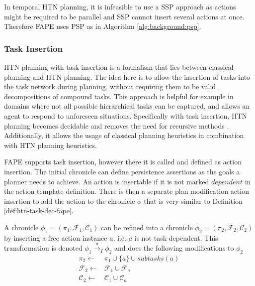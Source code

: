 In temporal \ac{HTN} planning, it is infeasible to use a \ac{SSP} approach as actions might be required to be parallel and \ac{SSP} cannot insert several actions at once.
Therefore \ac{FAPE} uses \ac{PSP} as in Algorithm \ref{alg:background:psp}.

\subsubsection{Task Insertion}

\ac{HTN} planning with task insertion \citep{geierDecidabilityHTNPlanning2011} is a formalism that lies between classical planning and \ac{HTN} planning.
The idea here is to allow the insertion of tasks into the task network during planning, without requiring them to be valid decompositions of compound tasks.
This approach is helpful for example in domains where not all possible hierarchical tasks can be captured, and allows an agent to respond to unforeseen situations.
Specifically with task insertion, \ac{HTN} planning becomes decidable \citep{geierDecidabilityHTNPlanning2011} and removes the need for recursive methods \citep{bercherSurveyHierarchicalPlanning2019}. 
Additionally, it allows the usage of classical planning heuristics in combination with \ac{HTN} planning heuristics.

\ac{FAPE} supports task insertion, however there it is called and defined as action insertion.
The initial chronicle can define persistence assertions as the goals a planner needs to achieve.
An action is insertable if it is not marked $dependent$ in the action template definition.
There is then a separate plan modification action insertion to add the action to the chronicle $\phi$ that is very similar to Definition \ref{def:htn-task-dec-fape}.

\begin{definition}
  A chronicle $\phi_1 = (\pi_1,\mathcal{F}_1,\mathcal{C}_1)$ can be refined into a chronicle $\phi_2 = (\pi_2,\mathcal{F}_2,\mathcal{C}_2)$ by inserting a free action instance $a$, i.e. $a$ is not task-dependent. This transformation is denoted $\phi_1 \xrightarrow{a}_I \phi_2$ and does the following modifications to $\phi_2$
  \begin{align*}
    \pi_2 \leftarrow & \pi_1 \cup \{a\} \cup subtasks(a) \\
    \mathcal{F}_2 \leftarrow & \mathcal{F}_1 \cup \mathcal{F}_a \\
    \mathcal{C}_2 \leftarrow & \mathcal{C}_1 \cup \mathcal{C}_a \\
  \end{align*}
\end{definition}

